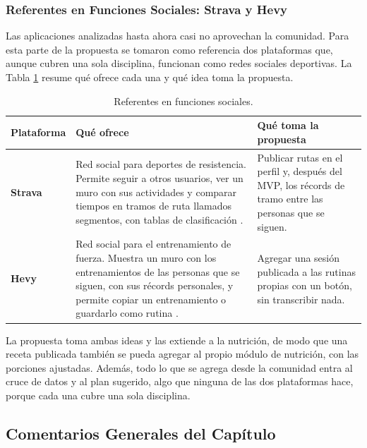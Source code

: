 \subsubsection{Referentes en Funciones Sociales: Strava y Hevy}
Las aplicaciones analizadas hasta ahora casi no aprovechan la comunidad. Para esta parte de la propuesta se tomaron como referencia dos plataformas que, aunque cubren una sola disciplina, funcionan como redes sociales deportivas. La Tabla \ref{tab:referentes_sociales} resume qué ofrece cada una y qué idea toma la propuesta.

\begin{table}[h!]
    \centering
    \renewcommand{\arraystretch}{1.4}
    \begin{tabular}{|>{\raggedright\arraybackslash}m{2.2cm}|>{\raggedright\arraybackslash}m{6.6cm}|>{\raggedright\arraybackslash}m{6cm}|}
        \hline
        \rowcolor[HTML]{EFEFEF}
        \textbf{Plataforma} & \textbf{Qué ofrece} & \textbf{Qué toma la propuesta} \\ \hline
        \textbf{Strava} & Red social para deportes de resistencia. Permite seguir a otros usuarios, ver un muro con sus actividades y comparar tiempos en tramos de ruta llamados segmentos, con tablas de clasificación \citep{strava_segments}. & Publicar rutas en el perfil y, después del MVP, los récords de tramo entre las personas que se siguen. \\ \hline
        \textbf{Hevy} & Red social para el entrenamiento de fuerza. Muestra un muro con los entrenamientos de las personas que se siguen, con sus récords personales, y permite copiar un entrenamiento o guardarlo como rutina \citep{hevy_social}. & Agregar una sesión publicada a las rutinas propias con un botón, sin transcribir nada. \\ \hline
    \end{tabular}
    \caption{Referentes en funciones sociales.}
    \label{tab:referentes_sociales}
\end{table}

La propuesta toma ambas ideas y las extiende a la nutrición, de modo que una receta publicada también se pueda agregar al propio módulo de nutrición, con las porciones ajustadas. Además, todo lo que se agrega desde la comunidad entra al cruce de datos y al plan sugerido, algo que ninguna de las dos plataformas hace, porque cada una cubre una sola disciplina.

\subsection{Comentarios Generales del Capítulo}

